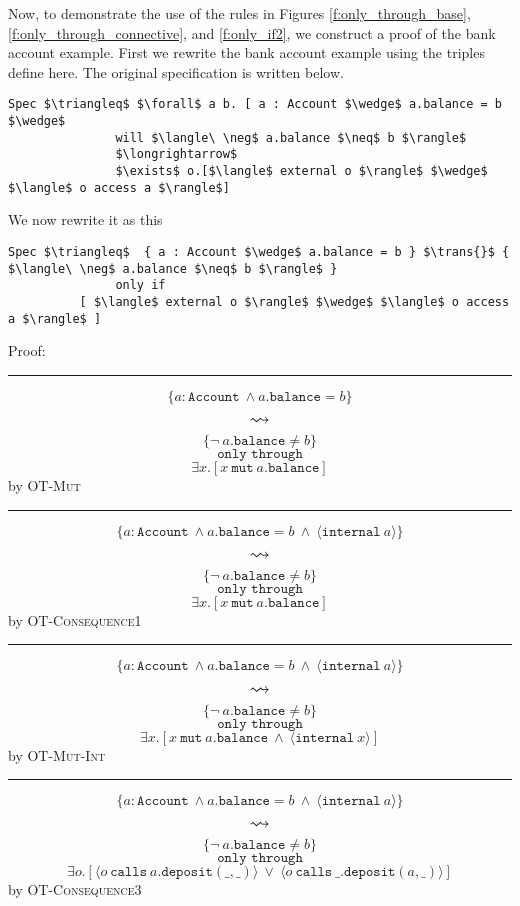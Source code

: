 \documentclass[12pt]{article}
\newcommand\trans[1]{\overset{#1}{\mathlarger{\mathlarger \leadsto}}}
\newcommand\mut[3]{#1\ \texttt{mut}\ #2.#3}
\begin{document}
Now, to demonstrate the use of the rules in Figures \ref{f:only_through_base}, \ref{f:only_through_connective}, and \ref{f:only_if2}, we construct 
a proof of the bank account example. First we rewrite the bank account example using the triples define here.
The original specification is written below.
\begin{lstlisting}[mathescape=true]
Spec $\triangleq$ $\forall$ a b. [ a : Account $\wedge$ a.balance = b $\wedge$
               will $\langle\ \neg$ a.balance $\neq$ b $\rangle$
               $\longrightarrow$
               $\exists$ o.[$\langle$ external o $\rangle$ $\wedge$ $\langle$ o access a $\rangle$]
\end{lstlisting}
We now rewrite it as this
\begin{lstlisting}[mathescape=true]
Spec $\triangleq$  { a : Account $\wedge$ a.balance = b } $\trans{}$ { $\langle\ \neg$ a.balance $\neq$ b $\rangle$ }
               only if
          [ $\langle$ external o $\rangle$ $\wedge$ $\langle$ o access a $\rangle$ ]
\end{lstlisting}
Proof:
\vspace{3mm}
\footnotesize
\hrule
\vspace{3mm}
$$
	\{a : \texttt{Account}\ \wedge a.\texttt{balance} = b\}
$$
$$\trans{}$$
$$
	\{\neg\ a.\texttt{balance} \neq b\}
$$
$$\texttt{only through}$$
$$
	\exists x.[\mut{x}{a}{\texttt{balance}}]
$$
\hfill by \textsc{OT-Mut}
\hrule
\vspace{3mm}
$$
	\{a : \texttt{Account}\ \wedge a.\texttt{balance} = b\ \wedge\  \langle \texttt{internal}\ a \rangle\}
$$
$$\trans{}$$
$$
	\{\neg\ a.\texttt{balance} \neq b\}
$$
$$\texttt{only through}$$
$$
	{\exists x.[\mut{x}{a}{\texttt{balance}}]}
$$
\hfill by \textsc{OT-Consequence1}
\hrule
\vspace{3mm}
$$
	\{a : \texttt{Account}\ \wedge a.\texttt{balance} = b\ \wedge\  \langle \texttt{internal}\ a \rangle\}
$$
$$\trans{}$$
$$
	\{\neg\ a.\texttt{balance} \neq b\}
$$
$$\texttt{only through}$$
$$
	{\exists x.[\mut{x}{a}{\texttt{balance}}\ \wedge\ \langle \texttt{internal}\ x \rangle]}
$$
\hfill by \textsc{OT-Mut-Int}
\hrule
\vspace{3mm}
$$
	\{a : \texttt{Account}\ \wedge a.\texttt{balance} = b\ \wedge\  \langle \texttt{internal}\ a \rangle\}
$$
$$\trans{}$$
$$
	\{\neg\ a.\texttt{balance} \neq b\}
$$
$$\texttt{only through}$$
$$
	{\exists o.[\langle o\ \texttt{calls}\ a.\texttt{deposit}(\_, \_) \rangle\ \vee\ \langle o\ \texttt{calls}\ \_.\texttt{deposit}(a, \_) \rangle]}
$$
\hfill by \textsc{OT-Consequence3}
\end{document}
